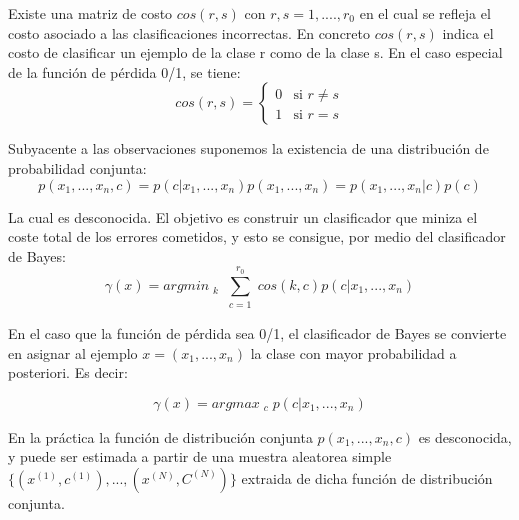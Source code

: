 	Existe una matriz de costo \begin{math} cos(r, s)\end{math} con \begin{math} r, s = 1, ...., r_{0}\end{math} en el cual se refleja el costo asociado a las clasificaciones incorrectas. En concreto \begin{math} cos(r, s) \end{math} indica el costo de clasificar un ejemplo de la clase r como de la clase s. En el caso especial de la función de pérdida 0/1, se tiene:\\

	\[ cos(r, s) = \left \{ \begin{matrix} 0 & \mbox{si }r \ne s
\\ 1 & \mbox{si }r = s \end{matrix}\right. \]

	Subyacente a las observaciones suponemos la existencia de una distribución de probabilidad conjunta:\\

	\[
		p(x_{1}, ..., x_{n}, c) = p(c | x_{1}, ..., x_{n})p(x_{1}, ..., x_{n}) = p(x_{1}, ..., x_{n}|c)p(c)
	\]

	La cual es desconocida. El objetivo es construir un clasificador que miniza el coste total de los errores cometidos, y esto se consigue, \cite{NaiveBayes3} por medio del clasificador de Bayes:\\

	\[
		\gamma(x) = arg min_{\substack{k}} \sum^{r_{0}}_{\substack{c = 1}} cos(k,c)p(c | x_{1}, ..., x_{n})
	\]

	En el caso que la función de pérdida sea 0/1, el clasificador de Bayes se convierte en asignar al ejemplo \begin{math} x = (x_{1}, ..., x_{n})\end{math} la clase con mayor probabilidad a posteriori. Es decir:

	\[
		\gamma(x) = arg max_{\substack{c}} p(c | x_{1}, ..., x_{n})
	\]

	En la práctica la función de distribución conjunta \begin{math} p(x_{1}, ..., x_{n}, c) \end{math} es desconocida, y puede ser estimada a partir de una muestra aleatorea simple \begin{math} \{ (x^{(1)}, c^{(1)} ), ..., (x^{(N)}, C^{(N)})\}\end{math} extraida de dicha función de distribución conjunta.\\

